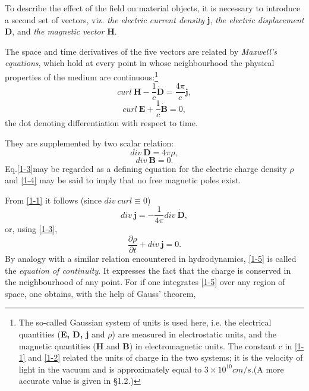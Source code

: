 \documentclass[lang=en,11pt]{elegantbook}
\begin{document}
	To describe the effect of the field on material objects, it is necessary to introduce a second set of vectors, viz. \textit{the electric current density} \textbf{j}, \textit{the electric displacement} \textbf{D}, and \textit{the magnetic vector} \textbf{H}.\par 
	The space and time derivatives of the five vectors are related by \textit{Maxwell's equations}, which hold at every point in whose neighbourhood the physical properties of the medium are continuous:\footnote{The so-called Gaussian system of units is used here, i.e. the electrical quantities (\textbf{E, D, j} and $\rho$) are measured in electrostatic units, and the magnetic quantities (\textbf{H} and \textbf{B}) in electromagnetic units. The constant c in \eqref{1-1} and \eqref{1-2} related the units of charge in the two systems; it is the velocity of light in the vacuum and is approximately equal to $3\times10^{10}cm/s$.(A more accurate value is given in \S1.2.)}
	\begin{equation}
	curl\ \textbf{H}-\frac{1}{c}\dot{\textbf{D}}=\frac{4\pi}{c}\textbf{j},
	\label{1-1}
	\end{equation}
	\begin{equation}
	curl\ \textbf{E}+\frac{1}{c}\dot{\textbf{B}}=0,
	\label{1-2}
	\end{equation}
	the dot denoting differentiation with respect to time.\par
	They are supplemented by two scalar relation:
	\begin{equation}
	div\ \textbf{D}=4\pi\rho,
	\label{1-3}
	\end{equation}
	\begin{equation}
	div\ \textbf{B}=0.
	\label{1-4}
	\end{equation}
	Eq.\eqref{1-3}may be regarded as a defining equation for the electric charge density $\rho$ and \eqref{1-4} may be said to imply that no free magnetic poles exist.\par 
	From \eqref{1-1} it follows (since $div\ curl\equiv 0$)
	\begin{equation*}
	div\ \textbf{j}=-\frac{1}{4\pi}div\ \dot{\textbf{D}},
	\end{equation*}
	or, using \eqref{1-3},
	\begin{equation}
	\frac{\partial\rho}{\partial t}+div\ \textbf{j}=0.
	\label{1-5}
	\end{equation}
	By analogy with a similar relation encountered in hydrodynamics, \eqref{1-5} is called the \textit{equation of continuity}. It expresses the fact that the charge is conserved in the neighbourhood of any point. For if one integrates \eqref{1-5} over any region of space, one obtains, with the help of Gauss' theorem,
\end{document}
